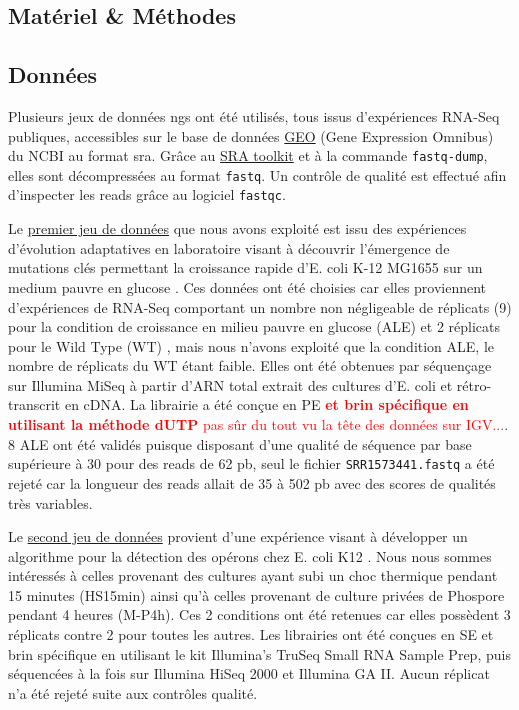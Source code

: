 \documentclass[12pt,a4paper]{report}
\begin{document}
\begin{onehalfspace}
\chapter*{Matériel \& Méthodes}

\section*{Données}
Plusieurs jeux de données \gls{ngs} ont été utilisés, tous issus d'expériences RNA-Seq publiques, accessibles sur le base de données \href{http://www.ncbi.nlm.nih.gov/geo/}{GEO} (Gene Expression Omnibus) du NCBI au format \gls{sra}. Grâce au \href{http://www.ncbi.nlm.nih.gov/books/NBK158900/#SRA_download.how_do_i_use_the_sra_toolki}{SRA toolkit} et à la commande \texttt{fastq-dump}, elles sont décompressées au format \texttt{fastq}. Un contrôle de qualité est effectué afin d'inspecter les \gls{reads} grâce au logiciel \texttt{fastqc}.

Le \href{http://www.ncbi.nlm.nih.gov/geo/query/acc.cgi?acc=GSE61327}{premier jeu de données} que nous avons exploité est issu des expériences d'évolution adaptatives en laboratoire visant à découvrir l'émergence de mutations clés permettant la croissance rapide d'E. coli K-12 MG1655 sur un medium pauvre en glucose \citep{Lacroix2014}. Ces données ont été choisies car elles proviennent d'expériences de RNA-Seq comportant un nombre non négligeable de réplicats (9) pour la condition de croissance en milieu pauvre en glucose (ALE) et 2 réplicats pour le Wild Type (WT) , mais nous n'avons exploité que la condition ALE, le nombre de réplicats du WT étant faible. Elles ont été obtenues par séquençage sur Illumina MiSeq à partir d'ARN total extrait des cultures d'E. coli et rétro-transcrit en cDNA. La librairie a été conçue en \gls{PE} \textcolor{red}{\textbf{et brin spécifique en utilisant la méthode dUTP} \citep{Levin2010} pas sûr du tout vu la tête des données sur IGV...}.  8 ALE ont été validés puisque disposant d'une qualité de séquence par base supérieure à 30 pour des reads de 62 pb, seul le fichier \texttt{SRR1573441.fastq} a été rejeté car la longueur des reads allait de 35 à 502 pb avec des scores de qualités très variables.

Le \href{http://bioinfolab.uncc.edu/TruHmm_package/raw_data/}{second jeu de données} provient d'une expérience visant à développer un algorithme pour la détection des opérons chez E. coli K12 \citep{Li2013}. Nous nous sommes intéressés à celles provenant des cultures ayant subi un choc thermique pendant 15 minutes (HS15min) ainsi qu'à celles provenant de culture privées de Phospore pendant 4 heures (M-P4h). Ces 2 conditions ont été retenues car elles possèdent 3 réplicats contre 2 pour toutes les autres. Les librairies ont été conçues en \gls{SE} et brin spécifique en utilisant le kit Illumina’s TruSeq Small RNA Sample Prep, puis séquencées à la fois sur Illumina HiSeq 2000 et Illumina GA II. Aucun réplicat n'a été rejeté suite aux contrôles qualité.


\end{onehalfspace}
\end{document}
